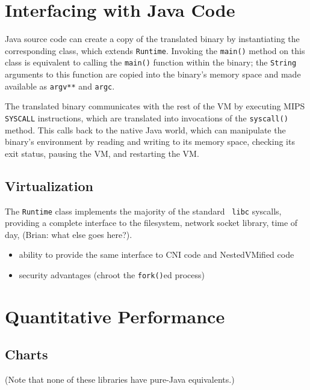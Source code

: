 \documentclass{acmconf}
\begin{document}
\section{Interfacing with Java Code}

Java source code can create a copy of the translated binary by
instantiating the corresponding class, which extends {\tt Runtime}.
Invoking the {\tt main()} method on this class is equivalent to
calling the {\tt main()} function within the binary; the {\tt String}
arguments to this function are copied into the binary's memory space
and made available as {\tt argv**} and {\tt argc}.

The translated binary communicates with the rest of the VM by
executing MIPS {\tt SYSCALL} instructions, which are translated into
invocations of the {\tt syscall()} method.  This calls back to the
native Java world, which can manipulate the binary's environment by
reading and writing to its memory space, checking its exit status,
pausing the VM, and restarting the VM.


\subsection{Virtualization}

The {\tt Runtime} class implements the majority of the standard {\tt
libc} syscalls, providing a complete interface to the filesystem,
network socket library, time of day, (Brian: what else goes here?).

\begin{itemize}

\item ability to provide the same interface to CNI code and
      NestedVMified code
      
\item security advantages (chroot the {\tt fork()}ed process)

\end{itemize}


\section{Quantitative Performance}

\subsection{Charts}

(Note that none of these libraries have pure-Java equivalents.)
\end{document}
